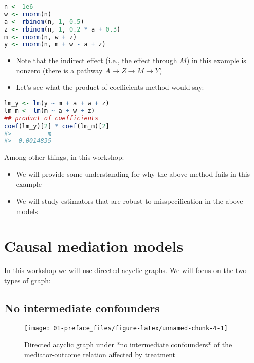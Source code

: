 \documentclass[
  12pt,
]{book}
\providecommand{\tightlist}{%
  \setlength{\itemsep}{0pt}\setlength{\parskip}{0pt}}
\theoremstyle{definition}
\theoremstyle{definition}
\theoremstyle{definition}
\newcommand{\1}{\mathbbm{1}}
\begin{document}
\begin{lstlisting}[language=R]
n <- 1e6
w <- rnorm(n)
a <- rbinom(n, 1, 0.5)
z <- rbinom(n, 1, 0.2 * a + 0.3)
m <- rnorm(n, w + z)
y <- rnorm(n, m + w - a + z)
\end{lstlisting}

\begin{itemize}
\tightlist
\item
  Note that the indirect effect (i.e., the effect through \(M\)) in this example
  is nonzero (there is a pathway \(A\rightarrow Z \rightarrow M \rightarrow Y\))
\item
  Let's see what the product of coefficients method would say:
\end{itemize}

\begin{lstlisting}[language=R]
lm_y <- lm(y ~ m + a + w + z)
lm_m <- lm(m ~ a + w + z)
## product of coefficients
coef(lm_y)[2] * coef(lm_m)[2]
#>          m 
#> -0.0014835
\end{lstlisting}

Among other things, in this workshop:

\begin{itemize}
\tightlist
\item
  We will provide some understanding for why the above method fails in this
  example
\item
  We will study estimators that are robust to misspecification in the above
  models
\end{itemize}

\hypertarget{causal-mediation-models}{%
\section{Causal mediation models}\label{causal-mediation-models}}

In this workshop we will use directed acyclic graphs. We will focus on the two
types of graph:

\hypertarget{no-intermediate-confounders}{%
\subsection{No intermediate confounders}\label{no-intermediate-confounders}}

\begin{figure}

{\centering \texttt{[image: 01-preface\_files/figure-latex/unnamed-chunk-4-1]} 

}

\caption{Directed acyclic graph under *no intermediate confounders* of the mediator-outcome relation affected by treatment}\label{fig:unnamed-chunk-4}
\end{figure}
\end{document}

